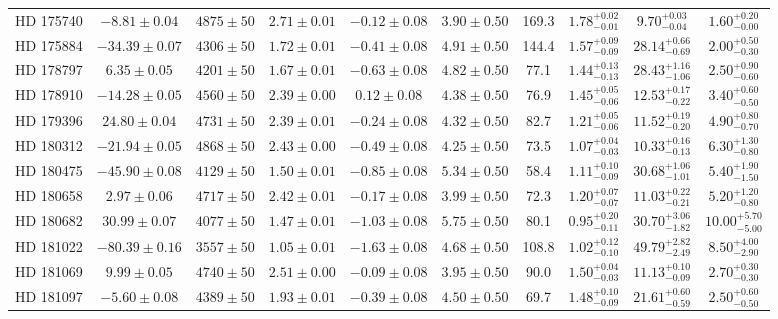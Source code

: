 \begin{table*}
\begin{tabular}{cccccccccc}
HD 175740 & $-8.81 \pm 0.04$ & $4875 \pm 50$ & $2.71 \pm 0.01$ & $-0.12 \pm 0.08$ & $3.90 \pm 0.50$ & 169.3 & $1.78^{+0.02}_{-0.01}$ & $9.70^{+0.03}_{-0.04}$ & $1.60^{+0.20}_{-0.00}$ \\
HD 175884 & $-34.39 \pm 0.07$ & $4306 \pm 50$ & $1.72 \pm 0.01$ & $-0.41 \pm 0.08$ & $4.91 \pm 0.50$ & 144.4 & $1.57^{+0.09}_{-0.09}$ & $28.14^{+0.66}_{-0.69}$ & $2.00^{+0.50}_{-0.30}$ \\
HD 178797 & $6.35 \pm 0.05$ & $4201 \pm 50$ & $1.67 \pm 0.01$ & $-0.63 \pm 0.08$ & $4.82 \pm 0.50$ & 77.1 & $1.44^{+0.13}_{-0.13}$ & $28.43^{+1.16}_{-1.06}$ & $2.50^{+0.90}_{-0.60}$ \\
HD 178910 & $-14.28 \pm 0.05$ & $4560 \pm 50$ & $2.39 \pm 0.00$ & $0.12 \pm 0.08$ & $4.38 \pm 0.50$ & 76.9 & $1.45^{+0.05}_{-0.06}$ & $12.53^{+0.17}_{-0.22}$ & $3.40^{+0.60}_{-0.50}$ \\
HD 179396 & $24.80 \pm 0.04$ & $4731 \pm 50$ & $2.39 \pm 0.01$ & $-0.24 \pm 0.08$ & $4.32 \pm 0.50$ & 82.7 & $1.21^{+0.05}_{-0.06}$ & $11.52^{+0.19}_{-0.20}$ & $4.90^{+0.80}_{-0.70}$ \\
HD 180312 & $-21.94 \pm 0.05$ & $4868 \pm 50$ & $2.43 \pm 0.00$ & $-0.49 \pm 0.08$ & $4.25 \pm 0.50$ & 73.5 & $1.07^{+0.04}_{-0.03}$ & $10.33^{+0.16}_{-0.13}$ & $6.30^{+1.30}_{-0.80}$ \\
HD 180475 & $-45.90 \pm 0.08$ & $4129 \pm 50$ & $1.50 \pm 0.01$ & $-0.85 \pm 0.08$ & $5.34 \pm 0.50$ & 58.4 & $1.11^{+0.10}_{-0.09}$ & $30.68^{+1.06}_{-1.01}$ & $5.40^{+1.90}_{-1.50}$ \\
HD 180658 & $2.97 \pm 0.06$ & $4717 \pm 50$ & $2.42 \pm 0.01$ & $-0.17 \pm 0.08$ & $3.99 \pm 0.50$ & 72.3 & $1.20^{+0.07}_{-0.07}$ & $11.03^{+0.22}_{-0.21}$ & $5.20^{+1.20}_{-0.80}$ \\
HD 180682 & $30.99 \pm 0.07$ & $4077 \pm 50$ & $1.47 \pm 0.01$ & $-1.03 \pm 0.08$ & $5.75 \pm 0.50$ & 80.1 & $0.95^{+0.20}_{-0.11}$ & $30.70^{+3.06}_{-1.82}$ & $10.00^{+5.70}_{-5.00}$ \\
HD 181022 & $-80.39 \pm 0.16$ & $3557 \pm 50$ & $1.05 \pm 0.01$ & $-1.63 \pm 0.08$ & $4.68 \pm 0.50$ & 108.8 & $1.02^{+0.12}_{-0.10}$ & $49.79^{+2.82}_{-2.49}$ & $8.50^{+4.00}_{-2.90}$ \\
HD 181069 & $9.99 \pm 0.05$ & $4740 \pm 50$ & $2.51 \pm 0.00$ & $-0.09 \pm 0.08$ & $3.95 \pm 0.50$ & 90.0 & $1.50^{+0.04}_{-0.03}$ & $11.13^{+0.10}_{-0.09}$ & $2.70^{+0.30}_{-0.30}$ \\
HD 181097 & $-5.60 \pm 0.08$ & $4389 \pm 50$ & $1.93 \pm 0.01$ & $-0.39 \pm 0.08$ & $4.50 \pm 0.50$ & 69.7 & $1.48^{+0.10}_{-0.09}$ & $21.61^{+0.60}_{-0.59}$ & $2.50^{+0.60}_{-0.50}$ \\

\end{tabular}
\end{table*}
